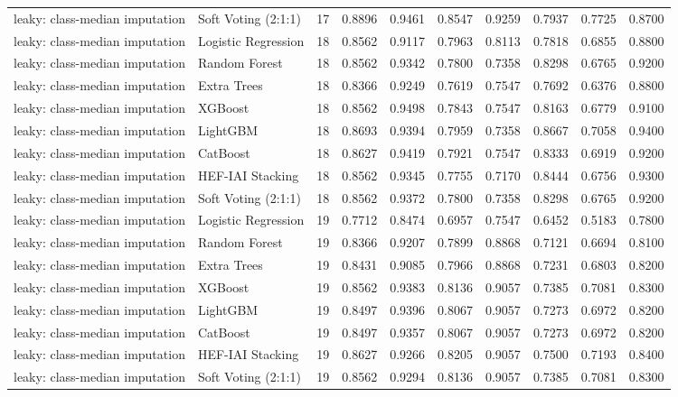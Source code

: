 \begin{tabular}{llrrrrrrrr}
leaky: class-median imputation & Soft Voting (2:1:1) & 17 & 0.8896 & 0.9461 & 0.8547 & 0.9259 & 0.7937 & 0.7725 & 0.8700 \\
leaky: class-median imputation & Logistic Regression & 18 & 0.8562 & 0.9117 & 0.7963 & 0.8113 & 0.7818 & 0.6855 & 0.8800 \\
leaky: class-median imputation & Random Forest & 18 & 0.8562 & 0.9342 & 0.7800 & 0.7358 & 0.8298 & 0.6765 & 0.9200 \\
leaky: class-median imputation & Extra Trees & 18 & 0.8366 & 0.9249 & 0.7619 & 0.7547 & 0.7692 & 0.6376 & 0.8800 \\
leaky: class-median imputation & XGBoost & 18 & 0.8562 & 0.9498 & 0.7843 & 0.7547 & 0.8163 & 0.6779 & 0.9100 \\
leaky: class-median imputation & LightGBM & 18 & 0.8693 & 0.9394 & 0.7959 & 0.7358 & 0.8667 & 0.7058 & 0.9400 \\
leaky: class-median imputation & CatBoost & 18 & 0.8627 & 0.9419 & 0.7921 & 0.7547 & 0.8333 & 0.6919 & 0.9200 \\
leaky: class-median imputation & HEF-IAI Stacking & 18 & 0.8562 & 0.9345 & 0.7755 & 0.7170 & 0.8444 & 0.6756 & 0.9300 \\
leaky: class-median imputation & Soft Voting (2:1:1) & 18 & 0.8562 & 0.9372 & 0.7800 & 0.7358 & 0.8298 & 0.6765 & 0.9200 \\
leaky: class-median imputation & Logistic Regression & 19 & 0.7712 & 0.8474 & 0.6957 & 0.7547 & 0.6452 & 0.5183 & 0.7800 \\
leaky: class-median imputation & Random Forest & 19 & 0.8366 & 0.9207 & 0.7899 & 0.8868 & 0.7121 & 0.6694 & 0.8100 \\
leaky: class-median imputation & Extra Trees & 19 & 0.8431 & 0.9085 & 0.7966 & 0.8868 & 0.7231 & 0.6803 & 0.8200 \\
leaky: class-median imputation & XGBoost & 19 & 0.8562 & 0.9383 & 0.8136 & 0.9057 & 0.7385 & 0.7081 & 0.8300 \\
leaky: class-median imputation & LightGBM & 19 & 0.8497 & 0.9396 & 0.8067 & 0.9057 & 0.7273 & 0.6972 & 0.8200 \\
leaky: class-median imputation & CatBoost & 19 & 0.8497 & 0.9357 & 0.8067 & 0.9057 & 0.7273 & 0.6972 & 0.8200 \\
leaky: class-median imputation & HEF-IAI Stacking & 19 & 0.8627 & 0.9266 & 0.8205 & 0.9057 & 0.7500 & 0.7193 & 0.8400 \\
leaky: class-median imputation & Soft Voting (2:1:1) & 19 & 0.8562 & 0.9294 & 0.8136 & 0.9057 & 0.7385 & 0.7081 & 0.8300 \\

\end{tabular}
